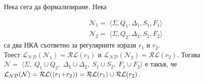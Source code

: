 \documentclass[12pt]{article}
\begin{document}
\par Нека сега да формализираме. Нека

\begin{align*}
    \mathcal{N}_1 = \; \langle \Sigma, Q_1, \Delta_1, S_1, F_1 \rangle \\
    \mathcal{N}_2 = \; \langle \Sigma, Q_2, \Delta_2, S_2, F_2 \rangle
\end{align*}
са два НКА съответно за регулярните изрази \(r_1\) и \(r_2\). \\
Тоест \(\mathcal{L_{ND}}(\mathcal{N}_1) = \mathcal{RL}(r_1)\) и \(\mathcal{L_{ND}}(\mathcal{N}_2) = \mathcal{RL}(r_2)\).
Тогава \\
\(\mathcal{N} = \; \langle \Sigma, \; Q_1 \cup Q_2, \; \Delta_1 \cup \Delta_2, \; S_1 \cup S_2, \; F_1 \cup F_2 \rangle\)
е такъв, че \\
\(\mathcal{L_{ND}}(\mathcal{N}) = \mathcal{RL}(\textcolor{blue}{(} r_1 \textcolor{blue}{+} r_2 \textcolor{blue}{)} ) = \mathcal{RL}(r_1) \cup \mathcal{RL}(r_2)\).
\end{document}
